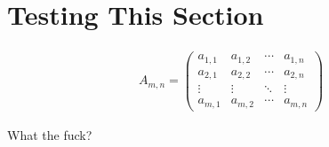 \documentclass{article}
\begin{document}

\section{Testing This Section}

\begin{align}
A_{m,n} = 
 \begin{pmatrix}
  a_{1,1} & a_{1,2} & \cdots & a_{1,n} \\
  a_{2,1} & a_{2,2} & \cdots & a_{2,n} \\
  \vdots  & \vdots  & \ddots & \vdots  \\
  a_{m,1} & a_{m,2} & \cdots & a_{m,n} 
 \end{pmatrix}
\end{align}

What the fuck? 
\end{document}
